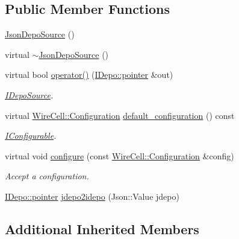 \subsection*{Public Member Functions}
\begin{DoxyCompactItemize}
\item 
\hyperlink{class_wire_cell_1_1_sio_1_1_json_depo_source_a812f5505901c009ee5784806b9c78f37}{Json\+Depo\+Source} ()
\item 
virtual \hyperlink{class_wire_cell_1_1_sio_1_1_json_depo_source_aac2d31fb85877e1f826d142ae302f2fa}{$\sim$\+Json\+Depo\+Source} ()
\item 
virtual bool \hyperlink{class_wire_cell_1_1_sio_1_1_json_depo_source_a3f276ed0e080cf1c4d1f1fec5bcd59e4}{operator()} (\hyperlink{class_wire_cell_1_1_i_data_aff870b3ae8333cf9265941eef62498bc}{I\+Depo\+::pointer} \&out)
\begin{DoxyCompactList}\small\item\em \hyperlink{class_wire_cell_1_1_i_depo_source}{I\+Depo\+Source}. \end{DoxyCompactList}\item 
virtual \hyperlink{namespace_wire_cell_a9f705541fc1d46c608b3d32c182333ee}{Wire\+Cell\+::\+Configuration} \hyperlink{class_wire_cell_1_1_sio_1_1_json_depo_source_a55e01822b3d36efed095e8e829633d4d}{default\+\_\+configuration} () const
\begin{DoxyCompactList}\small\item\em \hyperlink{class_wire_cell_1_1_i_configurable}{I\+Configurable}. \end{DoxyCompactList}\item 
virtual void \hyperlink{class_wire_cell_1_1_sio_1_1_json_depo_source_abc06840de469269082caee8f8c2369e0}{configure} (const \hyperlink{namespace_wire_cell_a9f705541fc1d46c608b3d32c182333ee}{Wire\+Cell\+::\+Configuration} \&config)
\begin{DoxyCompactList}\small\item\em Accept a configuration. \end{DoxyCompactList}\item 
\hyperlink{class_wire_cell_1_1_i_data_aff870b3ae8333cf9265941eef62498bc}{I\+Depo\+::pointer} \hyperlink{class_wire_cell_1_1_sio_1_1_json_depo_source_a55175816f32320c06cf760ebf9c1e3a3}{jdepo2idepo} (Json\+::\+Value jdepo)
\end{DoxyCompactItemize}
\subsection*{Additional Inherited Members}


